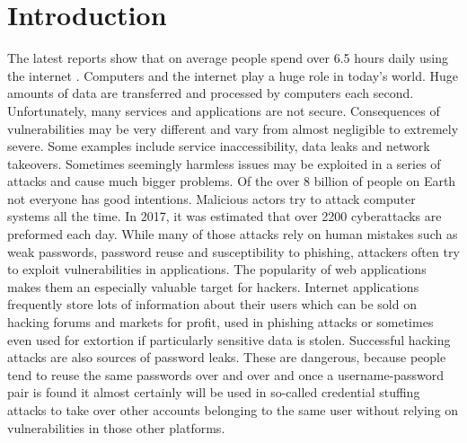 \chapter{Introduction}

The latest reports show that on average people spend over 6.5 hours daily using the internet \cite{bib:digital-2023}. Computers and the internet play a huge role in today's world. Huge amounts of data are transferred and processed by computers each second. Unfortunately, many services and applications are not secure. Consequences of vulnerabilities may be very different and vary from almost negligible to extremely severe. Some examples include service inaccessibility, data leaks and network takeovers. Sometimes seemingly harmless issues may be exploited in a series of attacks and cause much bigger problems. Of the over 8 billion of people on Earth \cite{bib:UN-8B-population} not everyone has good intentions. Malicious actors try to attack computer systems all the time. In 2017, it was estimated that over 2200 cyberattacks are preformed each day. While many of those attacks rely on human mistakes such as weak passwords, password reuse and susceptibility to phishing, attackers often try to exploit vulnerabilities in applications. The popularity of web applications makes them an especially valuable target for hackers. Internet applications frequently store lots of information about their users which can be sold on hacking forums and markets for profit, used in phishing attacks or sometimes even used for extortion if particularly sensitive data is stolen. Successful hacking attacks are also sources of password leaks. These are dangerous, because people tend to reuse the same passwords over and over and once a username-password pair is found it almost certainly will be used in so-called credential stuffing attacks to take over other accounts belonging to the same user without relying on vulnerabilities in those other platforms.

